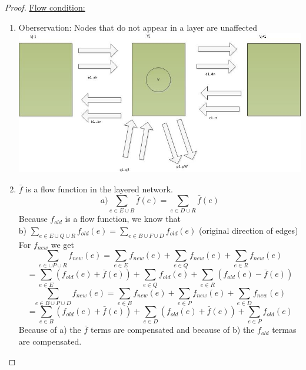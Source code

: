 \begin{proof}
\underline{Flow condition:} \\
\begin{enumerate}
\item Oberservation: Nodes that do not appear in a layer are unaffected
\includegraphics[width=\textwidth]{diagrams/Chapter3_Proof8.jpg} \\
\item $\bar{f}$ is a flow function in the layered network. 
\[ a) \sum_{e \in E \cup B}\bar{f}(e) = \sum_{e \in D \cup R}\bar{f}(e)\]
Because $f_{old}$ is a flow function, we know that \\
b) $\sum_{e \in E \cup Q \cup R}f_{old}(e) = \sum_{e \in B \cup F \cup D}f_{old}(e)$ (original direction of edges) \\
For $f_{new}$ we get 
\[\sum_{e \in  \cup P \cup R} f_{new}(e) = \sum_{e \in E}f_{new}(e) + \sum_{e \in Q}f_{new}(e) + \sum_{e \in R}f_{new}(e)\]
\[= \sum_{e \in E}(f_{old}(e)  + \bar{f}(e)) + \sum_{e \in Q}f_{old}(e) + \sum_{e \in R}(f_{old}(e) - \bar{f}(e))\]
\[\sum_{e \in B \cup P \cup D}f_{new}(e) = \sum_{e \in B}f_{new}(e) + \sum_{e \in P}f_{new}(e) + \sum_{e \in D}f_{new}(e)\]
\[= \sum_{e \in B}(f_{old}(e) + \bar{f}(e)) + \sum_{e \in D}(f_{old}(e) + \bar{f}(e)) + \sum_{e \in P}f_{old}(e)\]
Because of a) the $\bar{f}$ terms are compensated and because of b) the $f_{old}$ termas are compensated.
\end{enumerate}
\end{proof}